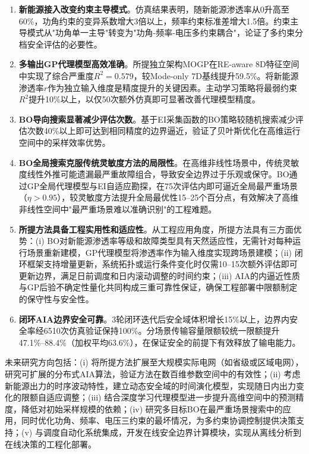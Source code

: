 \documentclass[a4paper,11pt]{ctexart}
\begin{document}
\begin{enumerate}
    \item \textbf{新能源接入改变约束主导模式}。仿真结果表明，随新能源渗透率从0升高至60\%，功角约束的变异系数增大3倍以上，频率约束标准差增大1.5倍。约束主导模式从"功角单一主导"转变为"功角-频率-电压多约束耦合"，论证了多约束分档安全评估的必要性。

    \item \textbf{多输出GP代理模型高效准确}。所提独立架构MOGP在RE-aware 8D特征空间中实现了综合严重度$R^2 = 0.579$，较Mode-only 7D基线提升59.5\%。将新能源渗透率$r$作为独立输入维度是精度提升的关键因素。主动学习策略将最弱约束$R^2$提升10\%以上，以仅50次额外仿真即可显著改善代理模型精度。

    \item \textbf{BO导向搜索显著减少评估次数}。基于EI采集函数的BO策略较随机搜索减少评估次数40\%以上即可达到相同精度的边界逼近，验证了贝叶斯优化在高维运行空间中的采样效率优势。

    \item \textbf{BO全局搜索克服传统灵敏度方法的局限性}。在高维非线性场景中，传统灵敏度线性外推可能遗漏最严重故障组合，导致安全边界过于乐观或保守。BO通过GP全局代理模型与EI自适应勘探，在75次评估内即可逼近全局最严重场景（$\eta > 0.95$），较灵敏度方法提升全局最优性15--25个百分点，有效解决了高维非线性空间中"最严重场景难以准确识别"的工程难题。

    \item \textbf{所提方法具备工程实用性和适应性}。从工程应用角度，所提方法具有三方面优势：(i) BO对新能源渗透率等级和故障类型具有天然适应性，无需针对每种运行场景重新建模，GP代理模型将渗透率作为输入维度实现跨场景建模；(ii) 闭环框架支持增量更新，系统拓扑或运行条件变化时仅需10--15次额外评估即可更新边界，满足日前调度和日内滚动调整的时间约束；(iii) AIA的内逼近性质与GP后验不确定性量化共同构成三重可靠性保证，确保工程部署中限额制定的保守性与安全性。

    \item \textbf{闭环AIA边界安全可靠}。3轮闭环迭代后安全域体积增长15\%以上，边界内安全率经6510次仿真验证保持100\%。分场景传输容量限额较统一限额提升47.1\%--88.4\%（加权平均63.6\%），在保证安全的前提下有效释放了输电能力。
\end{enumerate}

未来研究方向包括：(i) 将所提方法扩展至大规模实际电网（如省级或区域电网），研究可扩展的分布式AIA算法，验证方法在数百维参数空间中的有效性；(ii) 考虑新能源出力的时序波动特性，建立动态安全域的时间演化模型，实现随日内出力变化的限额自适应调整；(iii) 结合深度学习代理模型进一步提升高维空间中的预测精度，降低对初始采样规模的依赖；(iv) 研究多目标BO在最严重场景搜索中的应用，同时优化功角、频率、电压三约束的最坏情况，为多约束协调控制提供决策支持；(v) 与调度自动化系统集成，开发在线安全边界计算模块，实现从离线分析到在线决策的工程化部署。



\end{document}
